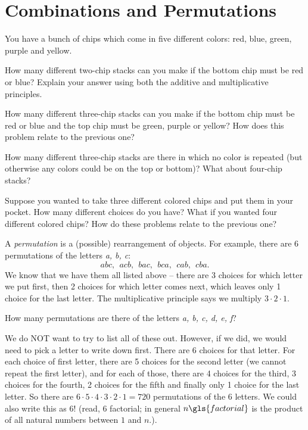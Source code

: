\documentclass[12pt]{article}
\begin{document}
\section{Combinations and Permutations}\label{sec:comb-perm}

\begin{activity}
You have a bunch of chips which come in five different colors: red, blue, green, purple and yellow.
\begin{questions}

\question How many different two-chip stacks can you make if the bottom chip must be red or blue?  Explain your answer using both the additive and multiplicative principles.

\question How many different three-chip stacks can you make if the bottom chip must be red or blue and the top chip must be green, purple or yellow?  How does this problem relate to the previous one?

\question How many different three-chip stacks are there in which no color is repeated (but otherwise any colors could be on the top or bottom)? What about four-chip stacks?

\question Suppose you wanted to take three different colored chips and put them in your pocket.  How many different choices do you have?  What if you wanted four different colored chips?  How do these problems relate to the previous one?

\end{questions}
\end{activity}

A {\em permutation} is a (possible) rearrangement of objects.  For example, there are 6 permutations of the letters \textit{a, b, c}:
\[abc, ~~ acb, ~~ bac, ~~bca, ~~ cab, ~~ cba.\]
We know that we have them all listed above -- there are 3 choices for which letter we put first, then 2 choices for which letter comes next, which leaves only 1 choice for the last letter.  The multiplicative principle says we multiply $3\cdot 2 \cdot 1$.

\begin{example}
  How many permutations are there of the letters \textit{a, b, c, d, e, f}?
  \begin{solution}
    We do NOT want to try to list all of these out.  However, if we did, we would need to pick a letter to write down first.  There are 6 choices for that letter.  For each choice of first letter, there are 5 choices for the second letter (we cannot repeat the first letter), and for each of those, there are 4 choices for the third, 3 choices for the fourth, 2 choices for the fifth and finally only 1 choice for the last letter.  So there are $6 \cdot 5 \cdot 4 \cdot 3 \cdot 2 \cdot 1 = 720$ permutations of the 6 letters.  We could also write this as $6!$ (read, 6 factorial; in general $n\gls{factorial}$ is the product of all natural numbers between $1$ and $n$.).
  \end{solution}
\end{example}
\end{document}
